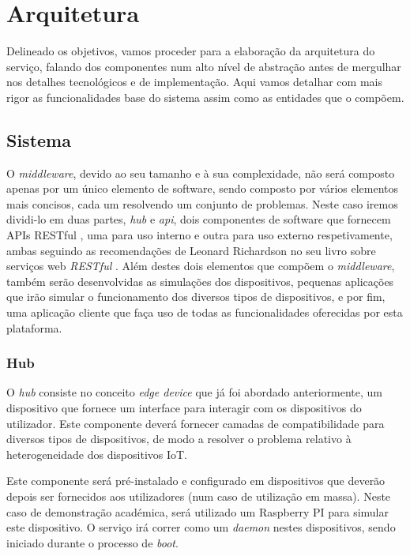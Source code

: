 \chapter{Arquitetura}

Delineado os objetivos, vamos proceder para a elaboração da arquitetura do serviço, falando dos componentes num alto nível de abstração antes de mergulhar nos detalhes tecnológicos e de implementação. Aqui vamos detalhar com mais rigor as funcionalidades base do sistema assim como as entidades que o compõem.

\section{Sistema}

O \textit{middleware}, devido ao seu tamanho e à sua complexidade, não será composto apenas por um único elemento de software, sendo composto por vários elementos mais concisos, cada um resolvendo um conjunto de problemas. Neste caso iremos dividi-lo em duas partes, \textit{hub} e \textit{api}, dois componentes de software que fornecem APIs RESTful , uma para uso interno e outra para uso externo respetivamente, ambas seguindo as recomendações de Leonard Richardson no seu livro sobre serviços web \textit{RESTful} \cite{richardson2013restful}. Além destes dois elementos que compõem o \textit{middleware}, também serão desenvolvidas as simulações dos dispositivos, pequenas aplicações que irão simular o funcionamento dos diversos tipos de dispositivos, e por fim, uma aplicação cliente que faça uso de todas as funcionalidades oferecidas por esta plataforma.

\subsection{Hub}

O \textit{hub} consiste no conceito \textit{edge device} que já foi abordado anteriormente, um dispositivo que fornece um interface para interagir com os dispositivos do utilizador. Este componente deverá fornecer camadas de compatibilidade para diversos tipos de dispositivos, de modo a resolver o problema relativo à heterogeneidade dos dispositivos IoT.

Este componente será pré-instalado e configurado em dispositivos que deverão depois ser fornecidos aos utilizadores (num caso de utilização em massa). Neste caso de demonstração académica, será utilizado um Raspberry PI para simular este dispositivo. O serviço irá correr como um \textit{daemon} nestes dispositivos, sendo iniciado durante o processo de \textit{boot}.

